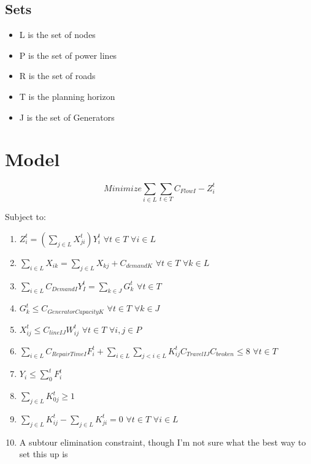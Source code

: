 \documentclass{article}
\begin{document}
\subsection{Sets}
\begin{itemize}
	\item L is the set of nodes
	\item P is the set of power lines
	\item R is the set of roads
	\item T is the planning horizon
	\item J is the set of Generators
\end{itemize}
	\section{Model}
	$$	Minimize \sum_{i \in L} \sum_{t \in T} C_{FlowI}-Z_{i}^t $$
	
	Subject to:
	\begin{enumerate}[label=(\arabic*), leftmargin=*, itemsep=0.4ex, before={\everymath{\displaystyle}}]%
		\item $Z_i^t = (\sum_{j \in L} X_{ji}^t) Y_i^t \hspace{4pt} \forall t \in T \hspace{4pt} \forall i \in L$
		\item $\sum_{i \in L} X_{ik} = \sum_{j \in L} X_{kj}+C_{demandK} \hspace{4pt} \forall t \in T \hspace{4pt} \forall k \in L$ 
		\item $\sum_{i \in L} C_{DemandI}Y_I^t = \sum_{k \in J} G_k^t \hspace{4pt} \forall t \in T$
		\item $G_k^t \leq C_{GeneratorCapacityK} \hspace{4pt} \forall t\in T \hspace{4pt} \forall k \in J$
		\item $X_{ij}^t \leq C_{lineIJ}W_{ij}^t \hspace{4pt} \forall t \in T \hspace{4pt} \forall i,j \in P$
		\item $\sum_{i \in L} C_{RepairTimeI} F_{i}^t + \sum_{i \in L} \sum_{j<i \in L}  K_{ij}^t C_{TravelIJ} C_{broken} \leq 8 \hspace{4pt} \forall t \in T \hspace{4pt}$
		\item $Y_i \leq \sum_{0}^{t} F_i^t$ 
		\item $\sum_{j \in L} K_{0j}^t \geq 1$
		\item $\sum_{j \in L}K_{ij}^t - \sum_{j \in L}K_{ji}^t = 0  \hspace{4pt} \forall t \in T \hspace{4pt} \forall i \in L$
		\item A subtour elimination constraint, though I'm not sure what the best way to set this up is 
	\end{enumerate}
\end{document}
